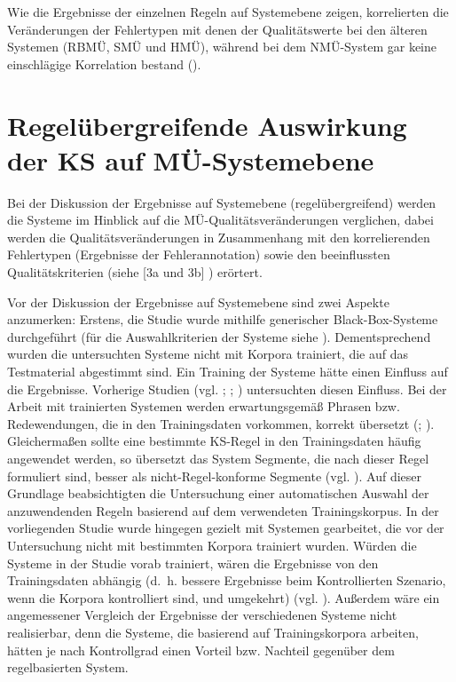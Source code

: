 Wie die Ergebnisse der einzelnen Regeln auf Systemebene zeigen, korrelierten die Veränderungen der Fehlertypen mit denen der Qualitätswerte bei den älteren Systemen (RBMÜ, SMÜ und HMÜ), während bei dem NMÜ-System gar keine einschlägige Korrelation bestand ().

\section{\label{sec:6.4}Regelübergreifende Auswirkung der KS auf MÜ-Systemebene}

Bei der Diskussion der Ergebnisse auf Systemebene (regelübergreifend) werden die Systeme im Hinblick auf die MÜ-Qualitätsveränderungen verglichen, dabei werden die Qualitätsveränderungen in Zusammenhang mit den korrelierenden Fehlertypen (Ergebnisse der Fehlerannotation) sowie den beeinflussten Qualitätskriterien (siehe [3a und 3b] ) erörtert.

Vor der Diskussion der Ergebnisse auf Systemebene sind zwei Aspekte anzumerken: Erstens, die Studie wurde mithilfe generischer Black-Box-Systeme durchgeführt (für die Auswahlkriterien der Systeme siehe ). Dementsprechend wurden die untersuchten Systeme nicht mit Korpora trainiert, die auf das Testmaterial abgestimmt sind. Ein Training der Systeme hätte einen Einfluss auf die Ergebnisse. Vorherige Studien (vgl. \citealt{RamirezPoloHaller2005}; \citealt{AikawaEtAl2007}; \citealt{LehmannEtAl2012}) untersuchten diesen Einfluss. Bei der Arbeit mit trainierten Systemen werden erwartungsgemäß Phrasen bzw. Redewendungen, die in den Trainingsdaten vorkommen, korrekt übersetzt (\citealt{RamirezPoloHaller2005}; \citealt{AikawaEtAl2007}). Gleichermaßen sollte eine bestimmte KS-Regel in den Trainingsdaten häufig angewendet werden, so übersetzt das System Segmente, die nach dieser Regel formuliert sind, besser als nicht-Regel-konforme Segmente (vgl. \citealt{LehmannEtAl2012}). Auf dieser Grundlage beabsichtigten \citet{LehmannEtAl2012} die Untersuchung einer automatischen Auswahl der anzuwendenden Regeln basierend auf dem verwendeten Trainingskorpus. In der vorliegenden Studie wurde hingegen gezielt mit Systemen gearbeitet, die vor der Untersuchung nicht mit bestimmten Korpora trainiert wurden. Würden die Systeme in der Studie vorab trainiert, wären die Ergebnisse von den Trainingsdaten abhängig (d.~h. bessere Ergebnisse beim Kontrollierten Szenario, wenn die Korpora kontrolliert sind, und umgekehrt) (vgl. \citealt{Reuther2003}). Außerdem wäre ein angemessener Vergleich der Ergebnisse der verschiedenen Systeme nicht realisierbar, denn die Systeme, die basierend auf Trainingskorpora arbeiten, hätten je nach Kontrollgrad einen Vorteil bzw. Nachteil gegenüber dem regelbasierten System.

